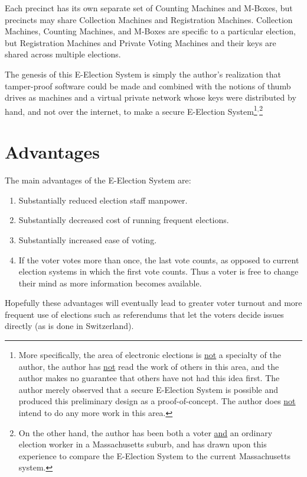 \documentclass[12pt]{article}
\begin{document}
Each precinct has its own separate set of Counting Machines and M-Boxes,
but precincts may share Collection Machines and Registration
Machines.  Collection Machines,
Counting Machines, and M-Boxes are
specific to a particular election, but Registration Machines
and Private Voting Machines and
their keys are shared across multiple elections.

The genesis of this E-Election System is simply the author's
realization that tamper-proof software could be made and
combined with the notions of thumb drives as machines and
a virtual private network whose keys were distributed by
hand, and not over the internet, to make a secure E-Election
System\footnote{More specifically, the area of electronic
elections is \underline{not} a specialty of the author, the
author has \underline{not} read the work of others in this
area, and the author makes no guarantee that others have not had
this idea first.  The author merely observed that a secure
E-Election System is possible and produced this preliminary
design as a proof-of-concept.
The author does \underline{not} intend to do any more work in this
area.}$^,$\footnote{On the other hand, the author has been both a voter
\underline{and}
an ordinary election worker in a Massachusetts suburb,
and has drawn upon this experience to compare the E-Election System
to the current Massachusetts system.}

\section{Advantages}

The main advantages of the E-Election System are:
\begin{enumerate}
\item Substantially reduced election staff manpower.
\item Substantially decreased cost of running frequent elections.
\item Substantially increased ease of voting.
\item If the voter votes more than once, the last vote counts,
      as opposed to current election systems in which the first vote counts.
      Thus a voter is free to change their mind as more information
      becomes available.
\end{enumerate}

Hopefully these advantages will eventually lead to
greater voter turnout and more frequent use of elections such
as referendums that let the voters decide issues directly
(as is done in Switzerland).
\end{document}
